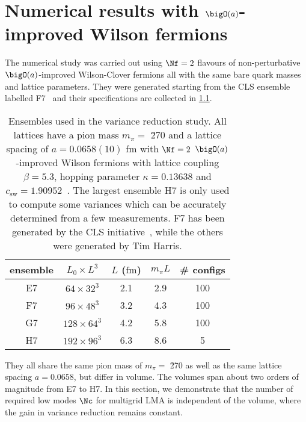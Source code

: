 \chapter{Numerical results with \texorpdfstring{$\bigO(a)$}{O(a)}-improved Wilson fermions}
\label{ch:p2:numerics}




The numerical study was carried out using $\Nf=2$ flavours of non-perturbative $\bigO(a)$-improved Wilson-Clover fermions all with the same bare quark masses and lattice parameters.
They were generated starting from the CLS ensemble labelled F7~\cite{online:cls} and their specifications are collected in \cref{tab:mglma:ensembles}.
\begin{table}[t]
\centering
\begin{tabular}{ccccc}
\toprule
{ensemble}&
{$L_0 \times L^3$}&
{$L$ ($\mathrm{fm}$)}&
{$m_{\pi} L$}&
{\# configs} \\
\midrule
E7 & $64  \times 32^3$ & 2.1 & 2.9 & 100 \\
F7 & $96  \times 48^3$ & 3.2 & 4.3 & 100 \\
G7 & $128 \times 64^3$ & 4.2 & 5.8 & 100 \\
H7 & $192 \times 96^3$ & 6.3 & 8.6 & 5   \\
\bottomrule
\end{tabular}
\caption{\label{tab:mglma:ensembles}%
Ensembles used in the variance reduction study.
All lattices have a pion mass $m_{\pi} = $ \u{270}{\MeV} and a lattice spacing of $a = 0.0658(10)$ fm with $\Nf=2$ $\bigO(a)$-improved Wilson fermions with lattice coupling $\beta=5.3$, hopping parameter $\kappa=0.13638$ and $c_\mathrm{sw} = 1.90952$~\cite{online:cls,Jansen:1998mx}.
The largest ensemble H7 is only used to compute some variances which can be accurately determined from a few measurements.
F7 has been generated by the CLS initiative~\cite{online:cls}, while the others were generated by Tim Harris.
}
\end{table}
They all share the same pion mass of $m_{\pi} = $ \u{270}{\MeV} as well as the same lattice spacing $a = 0.0658$, but differ in volume.
The volumes span about two orders of magnitude from E7 to H7.
In this section, we demonstrate that the number of required low modes $\Nc$ for multigrid LMA is independent of the volume, where the gain in variance reduction remains constant.

